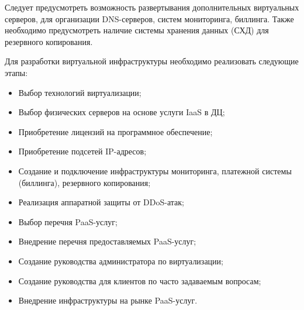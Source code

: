 Следует предусмотреть возможность развертывания дополнительных виртуальных серверов, для организации DNS-серверов, систем мониторинга, биллинга.
Также необходимо предусмотреть наличие системы хранения данных (СХД) для резервного копирования.

Для разработки виртуальной инфраструктуры необходимо реализовать следующие этапы:
\begin{itemize}
    \item Выбор технологий виртуализации;
    \item Выбор физических серверов на основе услуги IaaS в ДЦ;
    \item Приобретение лицензий на программное обеспечение;
    \item Приобретение подсетей IP-адресов;
    \item Создание и подключение инфраструктуры мониторинга, платежной системы (биллинга), резервного копирования;
    \item Реализация аппаратной защиты от DDoS-атак;
    \item Выбор перечня PaaS-услуг;
    \item Внедрение перечня предоставляемых PaaS-услуг;
    \item Создание руководства администратора по виртуализации;
    \item Создание руководства для клиентов по часто задаваемым вопросам;
    \item Внедрение инфраструктуры на рынке PaaS-услуг.
\end{itemize}

\clearpage
